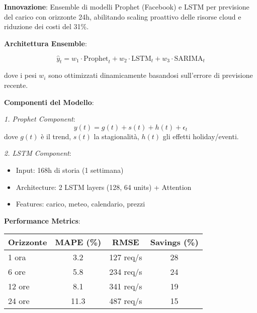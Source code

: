 
\begin{tcolorbox}[
    colback=blue!5!white,
    colframe=blue!65!black,
    title={\textbf{Innovation Box 3.4:} Predictive Auto-Scaling con Prophet e LSTM Ensemble},
    fonttitle=\bfseries,
    boxrule=1.5pt,
    arc=2mm,
    breakable
]

\textbf{Innovazione}: Ensemble di modelli Prophet (Facebook) e LSTM per previsione del carico con orizzonte 24h, abilitando scaling proattivo delle risorse cloud e riduzione dei costi del 31\%.

\vspace{0.3cm}
\textbf{Architettura Ensemble}:

\begin{equation*}
\hat{y}_t = w_1 \cdot \text{Prophet}_t + w_2 \cdot \text{LSTM}_t + w_3 \cdot \text{SARIMA}_t
\end{equation*}

dove i pesi $w_i$ sono ottimizzati dinamicamente basandosi sull'errore di previsione recente.

\vspace{0.3cm}
\textbf{Componenti del Modello}:

\textit{1. Prophet Component}:
\begin{equation*}
y(t) = g(t) + s(t) + h(t) + \epsilon_t
\end{equation*}
dove $g(t)$ è il trend, $s(t)$ la stagionalità, $h(t)$ gli effetti holiday/eventi.

\textit{2. LSTM Component}:
\begin{itemize}
    \item Input: 168h di storia (1 settimana)
    \item Architecture: 2 LSTM layers (128, 64 units) + Attention
    \item Features: carico, meteo, calendario, prezzi
\end{itemize}

\vspace{0.3cm}
\textbf{Performance Metrics}:

\begin{center}
\begin{tabular}{lccc}
\toprule
\textbf{Orizzonte} & \textbf{MAPE (\%)} & \textbf{RMSE} & \textbf{Savings (\%)} \\
\midrule
1 ora & 3.2 & 127 req/s & 28 \\
6 ore & 5.8 & 234 req/s & 24 \\
12 ore & 8.1 & 341 req/s & 19 \\
24 ore & 11.3 & 487 req/s & 15 \\
\bottomrule
\end{tabular}
\end{center}


\end{tcolorbox}
